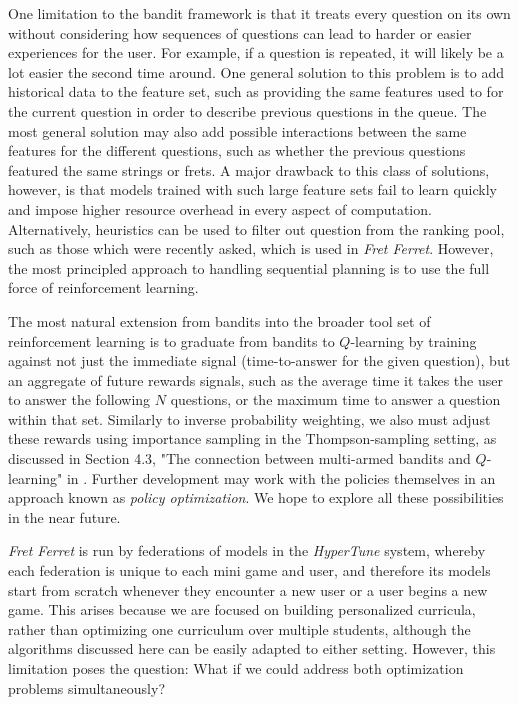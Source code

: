 \documentclass[manuscript, nonacm]{acmart_no_footer}
\begin{document}
One limitation to the bandit framework is that it treats every question on its own without considering how sequences of questions can lead to harder or easier experiences for the user. For example, if a question is repeated, it will likely be a lot easier the second time around. One general solution to this problem is to add historical data to the feature set, such as providing the same features used to for the current question in order to describe previous questions in the queue. The most general solution may also add possible interactions between the same features for the different questions, such as whether the previous questions featured the same strings or frets. A major drawback to this class of solutions, however, is that models trained with such large feature sets fail to learn quickly and impose higher resource overhead in every aspect of computation. Alternatively, heuristics can be used to filter out question from the ranking pool, such as those which were recently asked, which is used in \textit{Fret Ferret}. However, the most principled approach to handling sequential planning is to use the full force of reinforcement learning.

The most natural extension from bandits into the broader tool set of reinforcement learning is to graduate from bandits to $Q$-learning\cite{sutton_barto_rl} by training against not just the immediate signal (time-to-answer for the given question), but an aggregate of future rewards signals, such as the average time it takes the user to answer the following $N$ questions, or the maximum time to answer a question within that set. Similarly to inverse probability weighting, we also must adjust these rewards using importance sampling in the Thompson-sampling setting, as discussed in Section 4.3,  "The connection between multi-armed bandits and $Q$-learning" in \cite{Mason_Real-World_Reinforcement_Learning_2021}. Further development may work with the policies themselves in an approach known as \textit{policy optimization}\cite{online_policy_gradient_review}. We hope to explore all these possibilities in the near future.

\textit{Fret Ferret} is run by federations of models in the \textit{HyperTune} system, whereby each federation is unique to each mini game and user, and therefore its models start from scratch whenever they encounter a new user or a user begins a new game. This arises because we are focused on building personalized curricula, rather than optimizing one curriculum over multiple students, although the algorithms discussed here can be easily adapted to either setting. However, this limitation poses the question: What if we could address both optimization problems simultaneously? 
\end{document}
